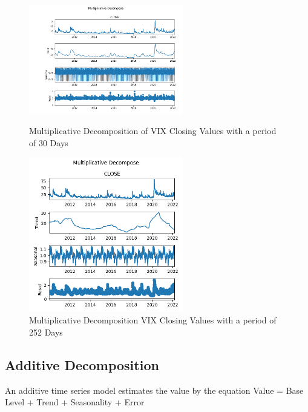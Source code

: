 \documentclass{article}
\begin{document}
\begin{figure}[h!]
    \centering
    \includegraphics[width= 0.6\textwidth]{VIX_multiplicative_decomp_30_2010}
    \caption{Multiplicative Decomposition of VIX Closing Values with a period of 30 Days}
    \includegraphics[width= 0.6\textwidth]{VIX_multiplicative_decomp_252_2010}
    \caption{Multiplicative Decomposition VIX Closing Values with a period of 252 Days}
\end{figure}

\newpage

\subsection{Additive Decomposition}
An additive time series model estimates the value by the equation Value = Base Level + Trend + Seasonality + Error
\end{document}
